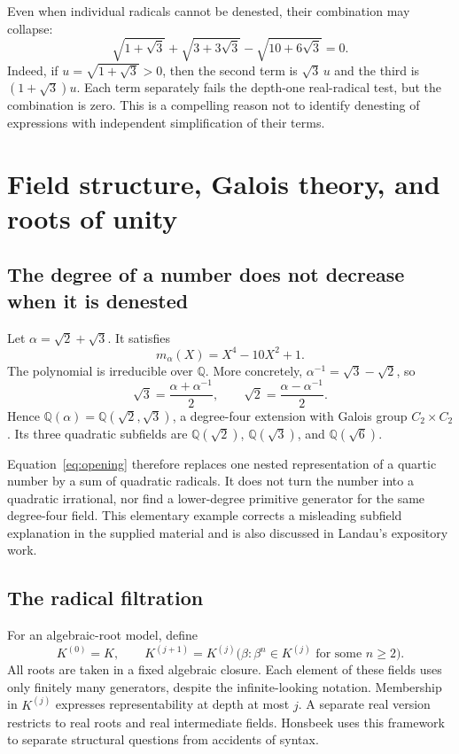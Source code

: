 \documentclass[11pt,a4paper]{article}
\newcommand{\Q}{\mathbb{Q}}
\theoremstyle{definition}
\theoremstyle{remark}
\numberwithin{equation}{section}
\begin{document}
Even when individual radicals cannot be denested, their combination may collapse:
\begin{equation}\label{eq:cancel}
 \sqrt{1+\sqrt3}+\sqrt{3+3\sqrt3}-\sqrt{10+6\sqrt3}=0.
\end{equation}
Indeed, if $u=\sqrt{1+\sqrt3}>0$, then the second term is $\sqrt3\,u$ and the third is $(1+\sqrt3)u$. Each term separately fails the depth-one real-radical test, but the combination is zero. This is a compelling reason not to identify denesting of expressions with independent simplification of their terms.\cite{bfht,blomerthesis}

\section{Field structure, Galois theory, and roots of unity}
\label{sec:fields}

\subsection{The degree of a number does not decrease when it is denested}

Let $\alpha=\sqrt2+\sqrt3$. It satisfies
\[
 m_\alpha(X)=X^4-10X^2+1.
\]
The polynomial is irreducible over $\Q$. More concretely, $\alpha^{-1}=\sqrt3-\sqrt2$, so
\[
 \sqrt3=\frac{\alpha+\alpha^{-1}}2,
 \qquad \sqrt2=\frac{\alpha-\alpha^{-1}}2.
\]
Hence $\Q(\alpha)=\Q(\sqrt2,\sqrt3)$, a degree-four extension with Galois group $C_2\times C_2$. Its three quadratic subfields are $\Q(\sqrt2)$, $\Q(\sqrt3)$, and $\Q(\sqrt6)$.

Equation~\eqref{eq:opening} therefore replaces one nested representation of a quartic number by a sum of quadratic radicals. It does not turn the number into a quadratic irrational, nor find a lower-degree primitive generator for the same degree-four field. This elementary example corrects a misleading subfield explanation in the supplied material and is also discussed in Landau's expository work.\cite{landau1998,cox,oeis}

\subsection{The radical filtration}

For an algebraic-root model, define
\begin{equation}\label{eq:filtration}
 K^{(0)}=K,\qquad
 K^{(j+1)}=K^{(j)}\bigl(\beta:\beta^n\in K^{(j)}
                       \text{ for some }n\ge2\bigr).
\end{equation}
All roots are taken in a fixed algebraic closure. Each element of these fields uses only finitely many generators, despite the infinite-looking notation. Membership in $K^{(j)}$ expresses representability at depth at most $j$. A separate real version restricts to real roots and real intermediate fields. Honsbeek uses this framework to separate structural questions from accidents of syntax.\cite{honsbeek2005}
\end{document}
